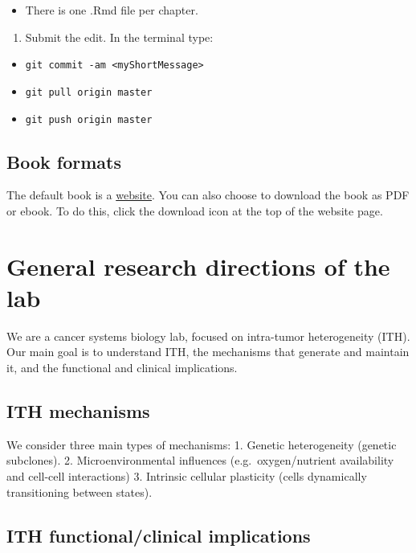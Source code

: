 \documentclass[]{book}
\providecommand{\tightlist}{%
  \setlength{\itemsep}{0pt}\setlength{\parskip}{0pt}}
\begin{document}
\begin{itemize}
\tightlist
\item
  There is one .Rmd file per chapter.
\end{itemize}

\begin{enumerate}
\def\labelenumi{\arabic{enumi}.}
\setcounter{enumi}{2}
\tightlist
\item
  Submit the edit. In the terminal type:
\end{enumerate}

\begin{itemize}
\tightlist
\item
  \texttt{git\ commit\ -am\ \textless{}myShortMessage\textgreater{}}
\item
  \texttt{git\ pull\ origin\ master}
\item
  \texttt{git\ push\ origin\ master}
\end{itemize}

\section{Book formats}\label{book-formats}

The default book is a
\href{https://tiroshlab.github.io/lab-book}{website}. You can also
choose to download the book as PDF or ebook. To do this, click the
download icon at the top of the website page.

\chapter{General research directions of the lab}\label{general}

We are a cancer systems biology lab, focused on intra-tumor
heterogeneity (ITH). Our main goal is to understand ITH, the mechanisms
that generate and maintain it, and the functional and clinical
implications.

\section{ITH mechanisms}\label{ith-mechanisms}

We consider three main types of mechanisms: 1. Genetic heterogeneity
(genetic subclones). 2. Microenvironmental influences
(e.g.~oxygen/nutrient availability and cell-cell interactions) 3.
Intrinsic cellular plasticity (cells dynamically transitioning between
states).

\section{ITH functional/clinical
implications}\label{ith-functionalclinical-implications}
\end{document}
